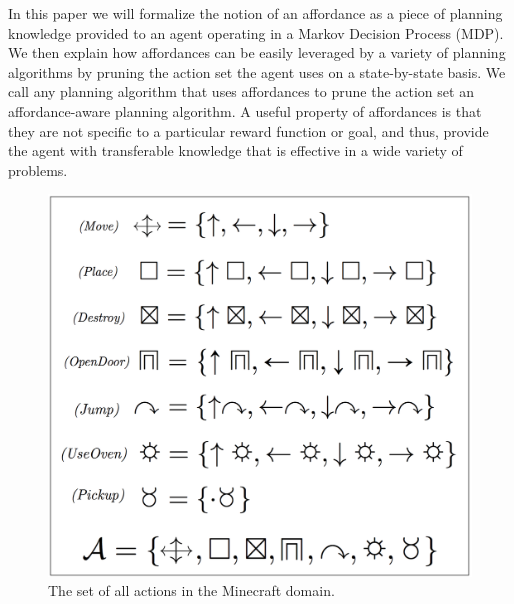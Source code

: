 \documentclass[]{article}
\begin{document}
In this paper we will formalize the notion of an affordance as a piece
of planning knowledge provided to an agent operating in a Markov
Decision Process (MDP). We then explain how
affordances can be easily leveraged by a variety of planning algorithms
by pruning the action set the agent uses on a state-by-state basis. We call
any planning algorithm that uses affordances to prune the action set an
affordance-aware planning algorithm.
A useful property of affordances is that they are not specific to a
particular reward function or goal, and thus, provide the agent with
transferable knowledge that is effective in a wide variety of
problems.




\begin{figure}
\centering
\includegraphics[scale = 0.15]{figures/all_actions.png}
\caption{The set of all actions in the Minecraft domain. \label{fig:all_actions}}
\end{figure}
\end{document}
